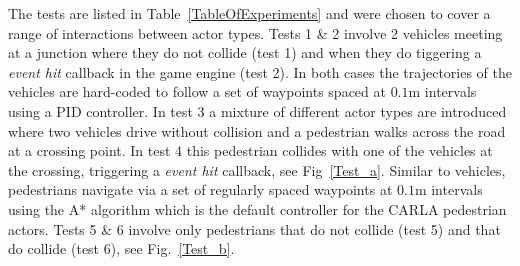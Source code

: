 \documentclass[letterpaper, 10 pt, journal, twoside]{IEEEtran}
\begin{document}
The tests are listed in Table~\ref{TableOfExperiments} and were chosen to cover a range of interactions between actor types. 
%
Tests 1 \& 2 involve 2 vehicles meeting at a junction where they do not collide (test 1) and when they do tiggering a \textit{event hit} callback in the game engine (test 2). In both cases the trajectories of the vehicles are hard-coded to follow a set of waypoints spaced at $0.1$m  intervals using a PID controller. In test 3 a mixture of different actor types are introduced where two vehicles drive without collision and a pedestrian walks across the road at a crossing point. In test 4 this pedestrian collides with one of the vehicles at the crossing, triggering a \textit{event hit} callback, see Fig~\ref{Test_a}. Similar to vehicles, pedestrians navigate via a set of regularly spaced waypoints at $0.1$m intervals using the A* algorithm which is the default controller for the CARLA pedestrian actors. Tests 5 \& 6 involve only pedestrians that do not collide (test 5) and that do collide (test 6), see Fig.~\ref{Test_b}. 


\end{document}

